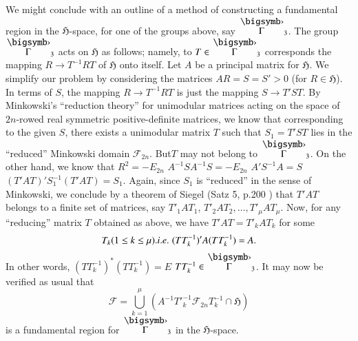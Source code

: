 We might conclude with an outline of a method of constructing a
fundamental region in the $\mathfrak{H}$-space, for one of the groups
above, say $\overdot{\Gamma}_{3}$. The group $\overdot{\Gamma}_{3}$
acts on $\mathfrak{H}$ as follows; namely, to
$T\in\overdot{\Gamma}_{3}$ corresponds the mapping $R\to T^{-1}RT$ of
$\mathfrak{H}$ onto itself. Let $A$ be a principal matrix for
$\mathfrak{H}$. We simplify our problem by considering the matrices
$AR=S=S'>0$ (for $R\in\mathfrak{H}$). In terms of $S$, the mapping
$R\to T^{-1}RT$ is just the mapping $S\to T'ST$. By Minkowski's
``reduction theory'' for unimodular matrices acting on the space of
$2n$-rowed real symmetric positive-definite matrices, we know that
corresponding to the given $S$, there exists a unimodular matrix $T$
such that $S_{1}=T'ST$ lies in the ``reduced'' Minkowski domain
$\mathscr{F}_{2n}$. But\pageoriginale $T$ may not belong to
$\overdot{\Gamma}_{3}$. On the other hand, we know that
$R^{2}=-E_{2n}$ \ie $A^{-1}SA^{-1}S=-E_{2n}$ \ie $A'S^{-1}A=S$ \ie
$(T'AT)'S^{-1}_{1}(T'AT)=S_{1}$. Again, since $S_{1}$ is ``reduced''
in the sense of Minkowski, we conclude by a theorem of Siegel (Satz 5,
p.200 \cite{20}) that $T'AT$ belongs to a finite set of matrices, say
$T'_{1}AT_{1}$, $T'_{2}AT_{2},\ldots,T'_{\mu}AT_{\mu}$. Now, for any
``reducing'' matrix $T$ obtained as above, we have $T'AT=T'_{k}AT_{k}$
for some 
$$T_{k}(1\leq k\leq \mu). {i.e.}\kern.3em
(TT^{-1}_{k})'A(TT^{-1}_{k})=A.$$ 
In other words,
$(TT^{-1}_{k})^{\ast}(TT^{-1}_{k})=E$ \ie
$TT^{-1}_{k}\in\overdot{\Gamma}_{3}$. It may now be verified as usual 
that
$$\mathscr{F}=\bigcup\limits^{\mu}_{k=1}(A^{-1}{T'}^{-1}_{k}\mathscr{F}_{2n}T^{-1}_{k}\cap    
\mathfrak{H})$$ 
is a fundamental region for $\overdot{\Gamma}_{3}$ in
the $\mathfrak{H}$-space.

